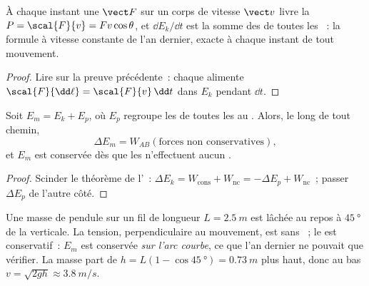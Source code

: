 \begin{proposition}\label{prop:g12:work-and-energy:power}
À chaque instant une  $\vect F$ sur un corps de vitesse
$\vect v$ livre la  $P = \scal{F}{v} = Fv\cos\theta$,
et $\dd E_k/\dd t$ est la somme des  de toutes les
~: la formule à vitesse constante de l'an dernier,
exacte à chaque instant de tout mouvement.
\end{proposition}

\begin{proof}
Lire sur la preuve précédente~: chaque  alimente
$\scal{F}{\dd\ell} = \scal{F}{v}\,\dd t$ dans $E_k$ pendant $\dd t$.
\end{proof}

\begin{theorem}\label{thm:g12:work-and-energy:emtheorem}
Soit $E_m = E_k + E_p$, où $E_p$ regroupe les 
de toutes les  au
. Alors, le long de tout chemin,
\[
\Delta E_m = W_{AB}(\text{forces non conservatives}),
\]
et $E_m$ est conservée dès que les  n'effectuent aucun .
\end{theorem}

\begin{proof}
Scinder le théorème de l'~: $\Delta E_k =
W_{\text{cons}} + W_{\text{nc}} = -\Delta E_p + W_{\text{nc}}$~;
passer $\Delta E_p$ de l'autre côté.
\end{proof}

\begin{example}\label{ex:g12:work-and-energy:pendulum}
Une masse de pendule sur un fil de longueur $L = \qty{2.5}{m}$ est
lâchée au repos à $\qty{45}{\degree}$ de la verticale. La
tension, perpendiculaire au mouvement, est sans ~;
le  est conservatif~: $E_m$ est
conservée \emph{sur l'arc courbe}, ce que l'an dernier ne pouvait
que vérifier. La masse part de $h = L(1 - \cos\qty{45}{\degree}) =
\qty{0.73}{m}$ plus haut, donc au bas $v = \sqrt{2gh} \approx
\qty{3.8}{m/s}$.
\end{example}

